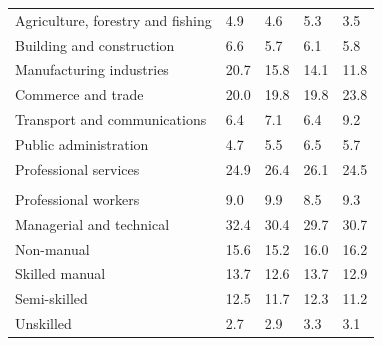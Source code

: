 \documentclass{article}
\begin{document}
\begin{table}[h]
\begin{tabular}{KTTTT}
    \hline
Agriculture, forestry and fishing  & 4.9& 4.6& 5.3& 3.5\\
Building and construction & 6.6& 5.7& 6.1& 5.8\\
Manufacturing industries & 20.7& 15.8& 14.1& 11.8\\
Commerce and trade  & 20.0& 19.8& 19.8& 23.8\\
Transport and communications  & 6.4& 7.1& 6.4& 9.2\\
Public administration & 4.7& 5.5& 6.5& 5.7\\
Professional services & 24.9& 26.4& 26.1& 24.5\\
\hline
    \\ 
    \hline
Professional workers  & 9.0& 9.9 & 8.5& 9.3\\
Managerial and technical & 32.4& 30.4& 29.7& 30.7\\
Non-manual & 15.6& 15.2& 16.0& 16.2\\
Skilled manual & 13.7& 12.6& 13.7& 12.9\\
Semi-skilled & 12.5& 11.7& 12.3& 11.2\\
Unskilled  & 2.7& 2.9& 3.3& 3.1\\
\end{tabular}
\end{table}
\pagebreak
\end{document}
